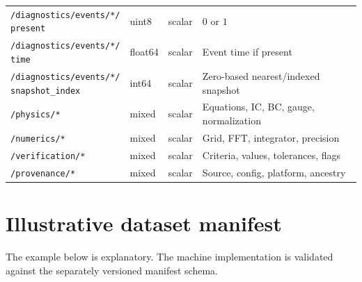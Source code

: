 \documentclass[11pt]{article}
\newcommand{\dataset}[1]{\texttt{/#1}}
\newcommand{\code}[1]{\texttt{#1}}
\begin{document}
\begin{longtable}{p{}p{}p{}p{}}
\makecell[l]{\code{/diagnostics/events/*/}\\\code{present}} & uint8 & scalar & $0$ or $1$ \\
\makecell[l]{\code{/diagnostics/events/*/}\\\code{time}} & float64 & scalar & Event time if present \\
\makecell[l]{\code{/diagnostics/events/*/}\\\code{snapshot\_index}} & int64 & scalar & Zero-based nearest/indexed snapshot \\
\dataset{physics/*} & mixed & scalar & Equations, IC, BC, gauge, normalization \\
\dataset{numerics/*} & mixed & scalar & Grid, FFT, integrator, precision \\
\dataset{verification/*} & mixed & scalar & Criteria, values, tolerances, flags \\
\dataset{provenance/*} & mixed & scalar & Source, config, platform, ancestry \\
\bottomrule
\end{longtable}
\normalsize

\section{Illustrative dataset manifest}
\label{app:manifest}

The example below is explanatory. The machine implementation is validated against the separately versioned manifest schema.
\end{document}
